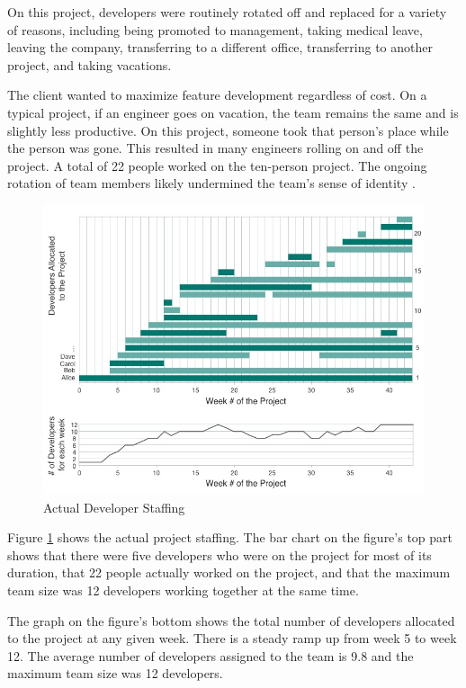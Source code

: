 On this project, developers were routinely rotated off and replaced for a variety of reasons, including being promoted to management, taking medical leave, leaving the company, transferring to a different office, transferring to another project, and taking vacations. 

The client wanted to maximize feature development regardless of cost. On a typical project, if an engineer goes on vacation, the team remains the same and is slightly less productive. On this project, someone took that person's place while the person was gone. This resulted in many engineers rolling on and off the project. A total of 22 people worked on the ten-person project. The ongoing rotation of team members likely undermined the team's sense of identity \cite{TuckmanModel}.

\begin{figure}[t]
\centering
\includegraphics[width=7.1in]{DeveloperStaffingV4.jpg}
\caption{Actual Developer Staffing}
\label{DeveloperStaffing}
\end{figure}

Figure \ref{DeveloperStaffing} shows the actual project staffing.  The bar chart on the figure's top part shows that there were five developers who were on the project for most of its duration, that 22 people actually worked on the project, and that the maximum team size was 12 developers working together at the same time.

The graph on the figure's bottom shows the total number of developers allocated to the project at any given week. There is a steady ramp up from week 5 to week 12. The average number of developers assigned to the team is 9.8 and the maximum team size was 12 developers.

